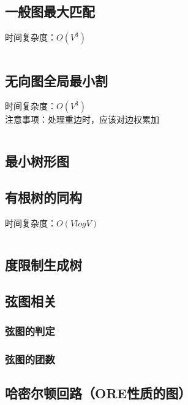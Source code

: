 \documentclass[a4paper]{article}
\newcommand{\cppcode}[1]{
    \inputminted[mathescape]{cpp}{source/#1}
}
\begin{document}
\subsection{一般图最大匹配}

时间复杂度：$O(V^3)$

\cppcode{graph-theory/maximum-matching-blossom.cpp}

\subsection{无向图全局最小割}

时间复杂度：$O(V^3)$\\
\indent 注意事项：处理重边时，应该对边权累加

\cppcode{graph-theory/minimum-cut-stoer-wagner.cpp}

\subsection{最小树形图}

\subsection{有根树的同构}

时间复杂度：$O(V log V)$

\cppcode{graph-theory/rooted-tree-isomorphism.cpp}

\subsection{度限制生成树}

\subsection{弦图相关}

\subsubsection{弦图的判定}

\subsubsection{弦图的团数}

\subsection{哈密尔顿回路（ORE性质的图）}
\end{document}
